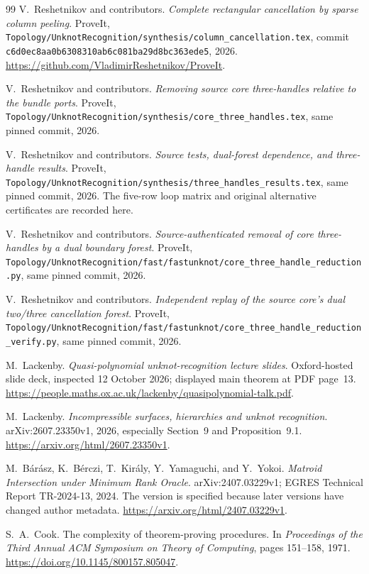\documentclass[11pt,letterpaper]{article}
\theoremstyle{definition}
\theoremstyle{remark}
\newcommand{\code}[1]{\nolinkurl{#1}}
\newcommand{\pin}{\texttt{c6d0ec8aa0b6308310ab6c081ba29d8bc363ede5}}
\begin{document}
\begin{thebibliography}{99}
V.~Reshetnikov and contributors.
\emph{Complete rectangular cancellation by sparse column peeling}.
ProveIt, \code{Topology/UnknotRecognition/synthesis/column_cancellation.tex},
commit \pin, 2026.
\url{https://github.com/VladimirReshetnikov/ProveIt}.

V.~Reshetnikov and contributors.
\emph{Removing source core three-handles relative to the bundle ports}.
ProveIt, \code{Topology/UnknotRecognition/synthesis/core_three_handles.tex},
same pinned commit, 2026.

V.~Reshetnikov and contributors.
\emph{Source tests, dual-forest dependence, and three-handle results}.
ProveIt, \code{Topology/UnknotRecognition/synthesis/three_handles_results.tex},
same pinned commit, 2026. The five-row loop matrix and original alternative
certificates are recorded here.

V.~Reshetnikov and contributors.
\emph{Source-authenticated removal of core three-handles by a dual boundary forest}.
ProveIt, \code{Topology/UnknotRecognition/fast/fastunknot/core_three_handle_reduction.py},
same pinned commit, 2026.

V.~Reshetnikov and contributors.
\emph{Independent replay of the source core's dual two/three cancellation forest}.
ProveIt, \code{Topology/UnknotRecognition/fast/fastunknot/core_three_handle_reduction_verify.py},
same pinned commit, 2026.

M.~Lackenby.
\emph{Quasi-polynomial unknot-recognition lecture slides}.
Oxford-hosted slide deck, inspected 12 October 2026; displayed main theorem at
PDF page~13.
\url{https://people.maths.ox.ac.uk/lackenby/quasipolynomial-talk.pdf}.

M.~Lackenby.
\emph{Incompressible surfaces, hierarchies and unknot recognition}.
arXiv:2607.23350v1, 2026, especially Section~9 and Proposition~9.1.
\url{https://arxiv.org/html/2607.23350v1}.

M.~B\'ar\'asz, K.~B\'erczi, T.~Kir\'aly, Y.~Yamaguchi, and Y.~Yokoi.
\emph{Matroid Intersection under Minimum Rank Oracle}.
arXiv:2407.03229v1; EGRES Technical Report TR-2024-13, 2024.
The version is specified because later versions have changed author metadata.
\url{https://arxiv.org/html/2407.03229v1}.

S.~A.~Cook.
The complexity of theorem-proving procedures.
In \emph{Proceedings of the Third Annual ACM Symposium on Theory of Computing},
pages 151--158, 1971.
\url{https://doi.org/10.1145/800157.805047}.
\end{thebibliography}
\end{document}
